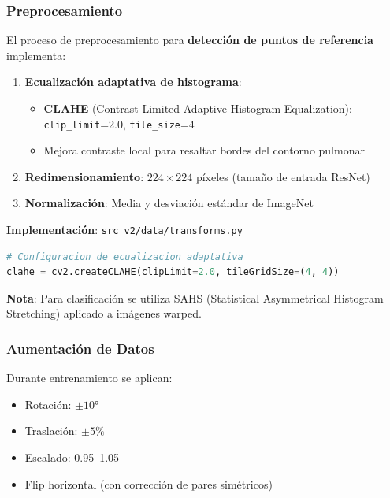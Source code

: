 \documentclass[12pt,a4paper]{article}
\newcommand{\code}[1]{\texttt{#1}}
\begin{document}
\subsubsection{Preprocesamiento}

El proceso de preprocesamiento para \textbf{detección de puntos de referencia} implementa:

\begin{enumerate}
    \item \textbf{Ecualización adaptativa de histograma}:
    \begin{itemize}
        \item \textbf{CLAHE} (Contrast Limited Adaptive Histogram Equalization): \code{clip\_limit}=2.0, \code{tile\_size}=4
        \item Mejora contraste local para resaltar bordes del contorno pulmonar
    \end{itemize}

    \item \textbf{Redimensionamiento}: $224 \times 224$ píxeles (tamaño de entrada ResNet)

    \item \textbf{Normalización}: Media y desviación estándar de ImageNet
\end{enumerate}

\textbf{Implementación}: \code{src\_v2/data/transforms.py}

\begin{lstlisting}[language=Python]
# Configuracion de ecualizacion adaptativa
clahe = cv2.createCLAHE(clipLimit=2.0, tileGridSize=(4, 4))
\end{lstlisting}

\textbf{Nota}: Para clasificación se utiliza SAHS (Statistical Asymmetrical Histogram Stretching) aplicado a imágenes warped.

\subsubsection{Aumentación de Datos}

Durante entrenamiento se aplican:

\begin{itemize}
    \item Rotación: $\pm 10°$
    \item Traslación: $\pm 5\%$
    \item Escalado: 0.95--1.05
    \item Flip horizontal (con corrección de pares simétricos)
\end{itemize}
\end{document}
